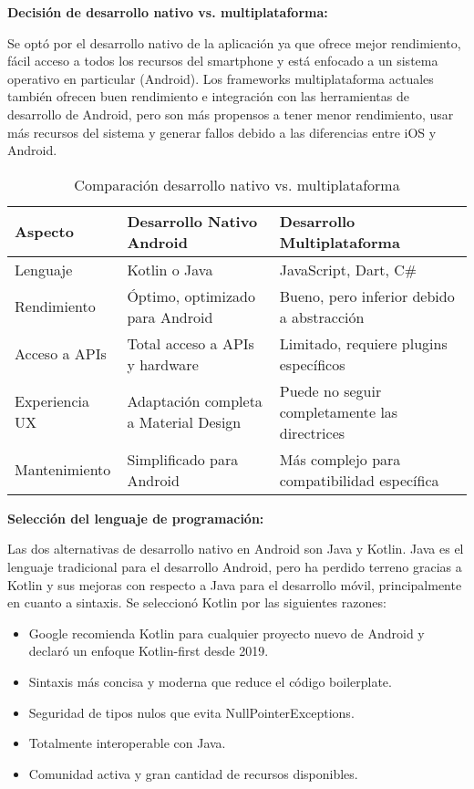 \textbf{Decisión de desarrollo nativo vs. multiplataforma:}

Se optó por el desarrollo nativo de la aplicación ya que ofrece mejor rendimiento, fácil acceso a todos los recursos del smartphone y está enfocado a un sistema operativo en particular (Android). Los frameworks multiplataforma actuales también ofrecen buen rendimiento e integración con las herramientas de desarrollo de Android, pero son más propensos a tener menor rendimiento, usar más recursos del sistema y generar fallos debido a las diferencias entre iOS y Android.

\begin{table}[H]
\centering
\caption{Comparación desarrollo nativo vs. multiplataforma}
\begin{tabular}{|p{}|p{}|p{}|}
\hline
\textbf{Aspecto} & \textbf{Desarrollo Nativo Android} & \textbf{Desarrollo Multiplataforma} \\
\hline
Lenguaje & Kotlin o Java & JavaScript, Dart, C\# \\
\hline
Rendimiento & Óptimo, optimizado para Android & Bueno, pero inferior debido a abstracción \\
\hline
Acceso a APIs & Total acceso a APIs y hardware & Limitado, requiere plugins específicos \\
\hline
Experiencia UX & Adaptación completa a Material Design & Puede no seguir completamente las directrices \\
\hline
Mantenimiento & Simplificado para Android & Más complejo para compatibilidad específica \\
\hline
\end{tabular}
\end{table}

\textbf{Selección del lenguaje de programación:}

Las dos alternativas de desarrollo nativo en Android son Java y Kotlin. Java es el lenguaje tradicional para el desarrollo Android, pero ha perdido terreno gracias a Kotlin y sus mejoras con respecto a Java para el desarrollo móvil, principalmente en cuanto a sintaxis. Se seleccionó Kotlin por las siguientes razones:

\begin{itemize}
    \item Google recomienda Kotlin para cualquier proyecto nuevo de Android y declaró un enfoque Kotlin-first desde 2019.
    \item Sintaxis más concisa y moderna que reduce el código boilerplate.
    \item Seguridad de tipos nulos que evita NullPointerExceptions.
    \item Totalmente interoperable con Java.
    \item Comunidad activa y gran cantidad de recursos disponibles.
\end{itemize}

